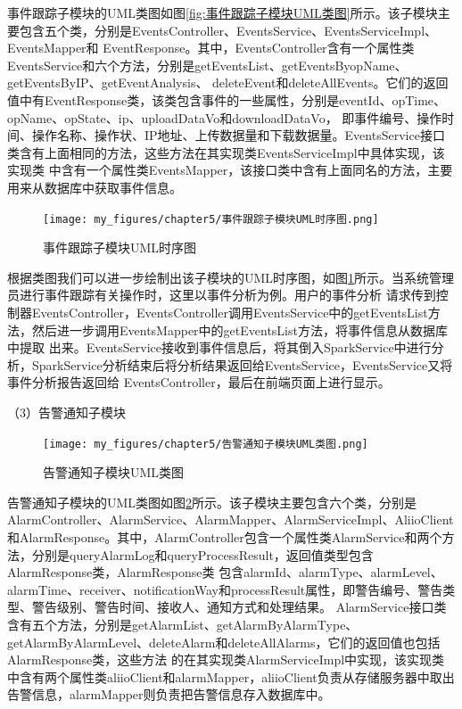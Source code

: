 事件跟踪子模块的UML类图如图\ref{fig:事件跟踪子模块UML类图}所示。该子模块主要包含五个类，分别是EventsController、EventsService、EventsServiceImpl、EventsMapper和
EventResponse。其中，EventsController含有一个属性类EventsService和六个方法，分别是getEventsList、getEventsByopName、getEventsByIP、getEventAnalysis、
deleteEvent和deleteAllEvents。它们的返回值中有EventResponse类，该类包含事件的一些属性，分别是eventId、opTime、opName、opState、ip、uploadDataVo和downloadDataVo，
即事件编号、操作时间、操作名称、操作状、IP地址、上传数据量和下载数据量。EventsService接口类含有上面相同的方法，这些方法在其实现类EventsServiceImpl中具体实现，该实现类
中含有一个属性类EventsMapper，该接口类中含有上面同名的方法，主要用来从数据库中获取事件信息。

\begin{figure}[htb]
    \centering
    \texttt{[image: my\_figures/chapter5/事件跟踪子模块UML时序图.png]}
    \caption{事件跟踪子模块UML时序图}
    \label{fig:事件跟踪子模块UML时序图}
\end{figure}

根据类图我们可以进一步绘制出该子模块的UML时序图，如图\ref{fig:事件跟踪子模块UML时序图}所示。当系统管理员进行事件跟踪有关操作时，这里以事件分析为例。用户的事件分析
请求传到控制器EventsController，EventsController调用EventsService中的getEventsList方法，然后进一步调用EventsMapper中的getEventsList方法，将事件信息从数据库中提取
出来。EventsService接收到事件信息后，将其倒入SparkService中进行分析，SparkService分析结束后将分析结果返回给EventsService，EventsService又将事件分析报告返回给
EventsController，最后在前端页面上进行显示。

（3）告警通知子模块

\begin{figure}[htb]
    \centering
    \texttt{[image: my\_figures/chapter5/告警通知子模块UML类图.png]}
    \caption{告警通知子模块UML类图}
    \label{fig:告警通知子模块UML类图}
\end{figure}

告警通知子模块的UML类图如图\ref{fig:告警通知子模块UML类图}所示。该子模块主要包含六个类，分别是AlarmController、AlarmService、AlarmMapper、AlarmServiceImpl、AliioClient
和AlarmResponse。其中，AlarmController包含一个属性类AlarmService和两个方法，分别是queryAlarmLog和queryProcessResult，返回值类型包含AlarmResponse类，AlarmResponse类
包含alarmId、alarmType、alarmLevel、alarmTime、receiver、notificationWay和processResult属性，即警告编号、警告类型、警告级别、警告时间、接收人、通知方式和处理结果。
AlarmService接口类含有五个方法，分别是getAlarmList、getAlarmByAlarmType、getAlarmByAlarmLevel、deleteAlarm和deleteAllAlarms，它们的返回值也包括AlarmResponse类，这些方法
的在其实现类AlarmServiceImpl中实现，该实现类中含有两个属性类aliioClient和alarmMapper，aliioClient负责从存储服务器中取出告警信息，alarmMapper则负责把告警信息存入数据库中。

